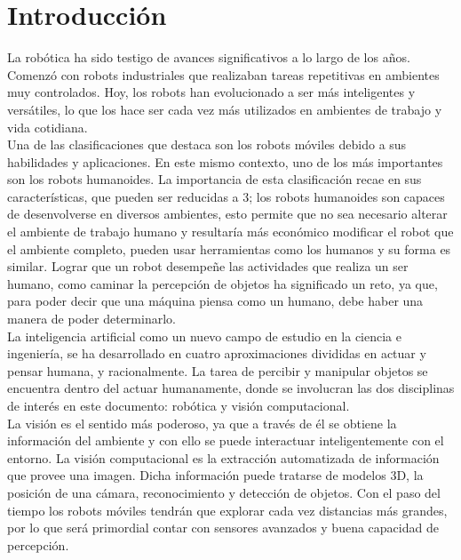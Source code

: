 \chapter{Introducción}
La robótica ha sido testigo de avances significativos a lo largo de los años. Comenzó con robots industriales que realizaban tareas repetitivas en ambientes muy controlados. Hoy, los robots han evolucionado a ser más inteligentes y versátiles\cite{rayhan2023artificial}, lo que los hace ser cada vez más utilizados en ambientes de trabajo y vida cotidiana.\cite{sadangharn2022acceptance} \\Una de las clasificaciones que destaca son los robots móviles debido a sus habilidades y aplicaciones. En este mismo contexto, uno de los más importantes son los robots humanoides.\cite{rubio2019review} La importancia de esta clasificación recae en sus características, que pueden ser reducidas a 3; los robots humanoides son capaces de desenvolverse en diversos ambientes, esto permite que no sea necesario alterar el ambiente de trabajo humano y resultaría más económico modificar el robot que el ambiente completo, pueden usar herramientas como los humanos y su forma es similar.\cite{kajita2014introduction}
 Lograr que un robot desempeñe las actividades que realiza un ser humano, como caminar la percepción de objetos ha significado un reto, ya que, para poder decir que una máquina piensa como un humano, debe haber una manera de poder  determinarlo.\\La inteligencia artificial como un nuevo campo de estudio en la ciencia e ingeniería, se ha desarrollado en cuatro aproximaciones divididas en actuar y pensar humana, y racionalmente. La tarea de percibir y manipular objetos se encuentra dentro del actuar humanamente, donde se involucran las dos disciplinas de interés en este documento: robótica y visión computacional. \cite {russell2016artificial}\\ La visión es el sentido más poderoso, ya que a través de él se obtiene la información del ambiente y con ello se puede interactuar inteligentemente con el entorno.\cite{milella2006computer} La visión computacional es la extracción automatizada de información que provee una imagen. Dicha información puede tratarse de modelos 3D, la posición de una cámara, reconocimiento y detección de objetos.\cite{erik2012programming} Con el paso del tiempo los robots móviles tendrán que explorar cada vez distancias más grandes, por lo que será primordial contar con sensores avanzados y buena capacidad de percepción. 

